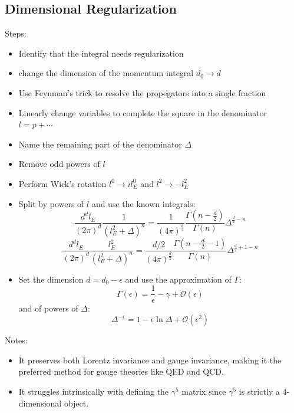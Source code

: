 \documentclass{article}
\begin{document}
\subsection{Dimensional Regularization}
Steps:
\begin{itemize}
    \item Identify that the integral needs regularization
    \item change the dimension of the momentum integral $d_0 \rightarrow d$
    \item Use Feynman's trick to resolve the propegators into a single fraction
    \item Linearly change variables to complete the square in the denominator $l = p + \cdots$
    \item Name the remaining part of the denominator $\Delta$
    \item Remove odd powers of $l$
    \item Perform Wick's rotation $l^0 \rightarrow il_E^0$ and $l^2 \rightarrow -l_E^2$
    \item Split by powers of $l$ and use the known integrals:
    \begin{equation}
        \frac{d^dl_E}{(2\pi)^d} \frac{1}{(l_E^2 + \Delta)^n} = \frac{1}{(4\pi)^\frac{d}{2}}\frac{\Gamma\left(n - \frac{d}{2}\right)}{\Gamma(n)}\Delta^{\frac{d}{2} - n}
    \end{equation}
    \begin{equation}
        \frac{d^dl_E}{(2\pi)^d} \frac{l_E^2}{(l_E^2 + \Delta)^n} = \frac{d/2}{(4\pi)^\frac{d}{2}}\frac{\Gamma\left(n - \frac{d}{2} - 1\right)}{\Gamma(n)}\Delta^{\frac{d}{2} + 1 - n}
    \end{equation}
    \item Set the dimension $d = d_0 - \epsilon$ and use the approximation of $\Gamma$:
    \begin{equation}
        \Gamma(\epsilon) = \frac{1}{\epsilon} - \gamma + \mathcal{O}(\epsilon)
    \end{equation}
    and of powers of $\Delta$:
    \begin{equation}
        \Delta^{-\epsilon} = 1 - \epsilon \ln\Delta + \mathcal{O}(\epsilon^2)
    \end{equation}
\end{itemize}
Notes:
\begin{itemize}
    \item It preserves both Lorentz invariance and gauge invariance, making it the preferred method for gauge theories like QED and QCD.
    \item It struggles intrinsically with defining the $\gamma^5$ matrix since $\gamma^5$ is strictly a 4-dimensional object.
\end{itemize}
\end{document}

